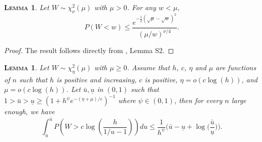 \documentclass[
  12pt]{article}
\newtheorem{lem}[thm]{\textsc{Lemma}}
\begin{document}
\begin{lem}\label{lemma:s2} Let $W \sim \chi_\nu^2(\mu)$ with $\mu>0$. For any $w<\mu$, 
$$
P(W<w) \leq \frac{e^{-\frac{1}{2}(\sqrt{\mu}-\sqrt{w})^2}}{(\mu / w)^{\nu / 4}}.$$
\end{lem}

\begin{proof}
The result follows directly from \cite{rossell2022concentration}, Lemma S2.
\end{proof}

\begin{lem}\label{lemma:s18} 
    Let $W\sim \chi_\eta^2(\mu)$ with $\mu \geq 0$. Assume that $h$, $c$, $\eta$ and $\mu$ are functions of $n$ such that $h$ is positive and increasing, $c$ is positive, $\eta=o(c\log(h))$, and $\mu=o(c\log(h))$. Let $\bar{u},\underline{u}$ in $(0,1)$ such that $1>\bar{u}>\underline{u}\geq\left(1+h^{\psi}e^{-(\eta+\mu)/c}\right)^{-1}$ where $\psi\in(0,1)$, then for every $n$ large enough, we have 
$$
\int_{\underline{u}}^{\bar{u}} P\left(W>c\log \left(\frac{h}{1 / u-1}\right)\right) d u \leq  \frac{1}{h^{\psi}}\Big(\bar{u}-\underline{u}+\log\Big(\frac{\bar{u}}{\underline{u}}\Big)\Big).
$$
\end{lem}
\end{document}
